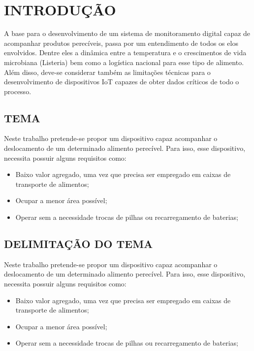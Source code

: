 \chapter{INTRODUÇÃO}\label{cap:introducao}
A base para o desenvolvimento de um sistema de monitoramento digital capaz de acompanhar produtos perecíveis, passa por um entendimento de todos os elos envolvidos. Dentre eles a dinâmica entre a temperatura e o crescimentos de vida microbiana (Listeria) bem como a logística nacional para esse tipo de alimento. Além disso, deve-se considerar também as limitações técnicas para o desenvolvimento de dispositivos IoT capazes de obter dados críticos de todo o processo.
\section{TEMA} 
Neste trabalho pretende-se propor um dispositivo capaz acompanhar o deslocamento de um determinado alimento perecível. Para isso, esse dispositivo, necessita possuir alguns requisitos como:
\begin{itemize}
    \item Baixo valor agregado, uma vez que precisa ser empregado em caixas de transporte de alimentos;
    \item Ocupar a menor área possível;
    \item Operar sem a necessidade trocas de pilhas ou recarregamento de baterias;
\end{itemize}
\section{DELIMITAÇÃO DO TEMA} 
Neste trabalho pretende-se propor um dispositivo capaz acompanhar o deslocamento de um determinado alimento perecível. Para isso, esse dispositivo, necessita possuir alguns requisitos como:
\begin{itemize}
    \item Baixo valor agregado, uma vez que precisa ser empregado em caixas de transporte de alimentos;
    \item Ocupar a menor área possível;
    \item Operar sem a necessidade trocas de pilhas ou recarregamento de baterias;
\end{itemize}

